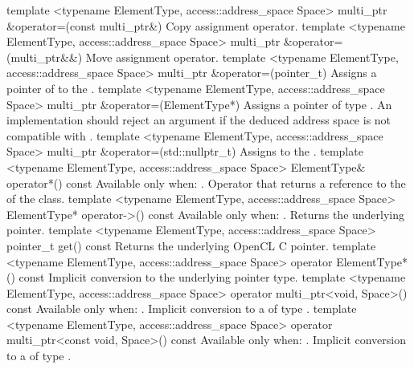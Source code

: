 \addRowTwoL
{template <typename ElementType, access::address_space Space>}
{multi_ptr \&operator=(const multi_ptr\&)}
{Copy assignment operator.}
\addRowTwoL
{template <typename ElementType, access::address_space Space>}
{multi_ptr \&operator=(multi_ptr\&\&)}
{Move assignment operator.}
\addRowTwoL
{template <typename ElementType, access::address_space Space>}
{multi_ptr \&operator=(pointer_t)}
{Assigns a pointer of  to the .}
\addRowTwoL
{template <typename ElementType, access::address_space Space>}
{multi_ptr \&operator=(ElementType*)}
{Assigns a pointer of type .
An implementation should reject an argument if the deduced address space is not compatible with .}
\addRowTwoL
{template <typename ElementType, access::address_space Space>}
{multi_ptr \&operator=(std::nullptr_t)}
{Assigns  to the .}
\addRowTwoL
{template <typename ElementType, access::address_space Space>}
{ElementType\& operator*() const}
{Available only when: .
\newline
Operator that returns a reference to the 
of the  class.}
\addRowTwoL
{template <typename ElementType, access::address_space Space>}
{ElementType* operator->() const}
{Available only when: .
\newline
Returns the underlying pointer.}
\addRowTwoL
{template <typename ElementType, access::address_space Space>}
{pointer_t get() const}
{Returns the underlying OpenCL C pointer.}
\addRowTwoL
{template <typename ElementType, access::address_space Space>}
{operator ElementType*() const}
{Implicit conversion to the underlying pointer type.}
\addRowTwoL
{template <typename ElementType, access::address_space Space>}
{operator multi_ptr<void, Space>() const}
{Available only when:
.
\newline
Implicit conversion to a  of type .}
\addRowTwoL
{template <typename ElementType, access::address_space Space>}
{operator multi_ptr<const void, Space>() const}
{Available only when:
.
\newline
Implicit conversion to a  of type .}
